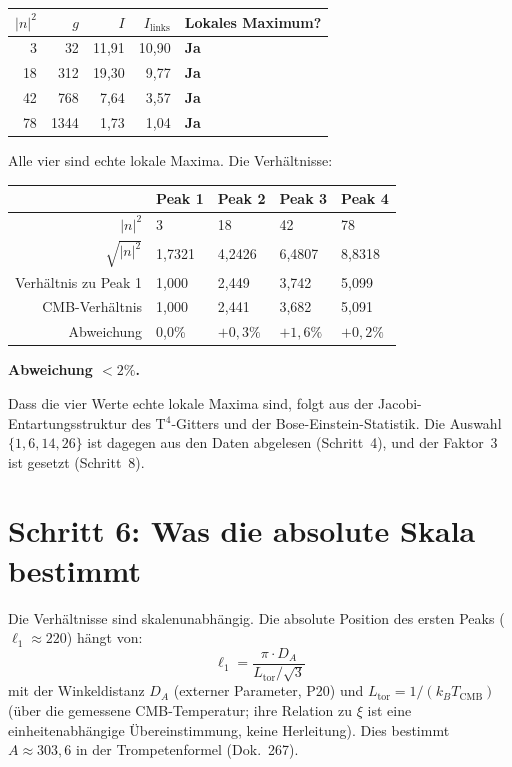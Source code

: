 \begin{center}
\begin{tabular}{rrrrl}
\toprule
$|n|^2$ & $g$ & $I$ & $I_\mathrm{links}$ & Lokales Maximum? \\
\midrule
3  & 32   & 11{,}91 & 10{,}90 & \textbf{Ja} \\
18 & 312  & 19{,}30 & 9{,}77  & \textbf{Ja} \\
42 & 768  & 7{,}64  & 3{,}57  & \textbf{Ja} \\
78 & 1344 & 1{,}73  & 1{,}04  & \textbf{Ja} \\
\bottomrule
\end{tabular}
\end{center}

Alle vier sind echte lokale Maxima. Die Verhältnisse:

\begin{center}
\begin{tabular}{rllll}
\toprule
 & Peak 1 & Peak 2 & Peak 3 & Peak 4 \\
\midrule
$|n|^2$ & 3 & 18 & 42 & 78 \\
$\sqrt{|n|^2}$ & 1{,}7321 & 4{,}2426 & 6{,}4807 & 8{,}8318 \\
Verhältnis zu Peak 1 & 1{,}000 & 2{,}449 & 3{,}742 & 5{,}099 \\
CMB-Verhältnis & 1{,}000 & 2{,}441 & 3{,}682 & 5{,}091 \\
Abweichung & 0{,}0\% & $+0{,}3\%$ & $+1{,}6\%$ & $+0{,}2\%$ \\
\bottomrule
\end{tabular}
\end{center}

\textbf{Abweichung $< 2\%$.}

Dass die vier Werte echte lokale Maxima sind, folgt aus der
Jacobi-Entartungsstruktur des T$^4$-Gitters und der Bose-Einstein-Statistik.
Die Auswahl $\{1,6,14,26\}$ ist dagegen aus den Daten abgelesen (Schritt~4),
und der Faktor~3 ist gesetzt (Schritt~8).

\section{Schritt 6: Was die absolute Skala bestimmt}

Die Verhältnisse sind skalenunabhängig. Die absolute Position
des ersten Peaks ($\ell_1 \approx 220$) hängt von:
\[
  \ell_1 = \frac{\pi \cdot D_A}{L_\mathrm{tor} / \sqrt{3}}
\]
mit der Winkeldistanz $D_A$ (externer Parameter, P20) und
$L_\mathrm{tor} = 1/(k_B T_\mathrm{CMB})$ (über die gemessene
CMB-Temperatur; ihre Relation zu $\xi$ ist eine einheitenabhängige
Übereinstimmung, keine Herleitung).
Dies bestimmt $A \approx 303{,}6$ in der Trompetenformel (Dok.~267).

